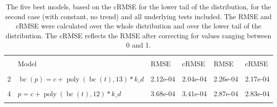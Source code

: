 \documentclass[12pt,a4paper]{article}
\DeclareMathOperator{\bc}{bc}
\DeclareMathOperator{\poly}{poly}
\begin{document}
\begin{table}[!h]

\caption{\label{tab:5_best_all_2}\label{tab:best_all_2} The five best models, based on the cRMSE for the lower tail of the distribution, for the second case (with constant, no trend) and all underlying tests included. The RMSE and cRMSE were calculated over the whole distribution and over the lower tail of the distribution. The cRMSE reflects the RMSE after correcting for values ranging between 0 and 1.}
\centering
\fontsize{10}{12}\selectfont
\begin{tabular}[t]{ll>{\raggedleft\arraybackslash}p{2cm}>{\raggedleft\arraybackslash}p{2cm}>{\raggedleft\arraybackslash}p{2cm}>{\raggedleft\arraybackslash}p{2cm}}
\toprule
\multicolumn{1}{c}{\textbf{}} & \multicolumn{1}{c}{\textbf{}} & \multicolumn{2}{c}{\textbf{Full Distribution}} & \multicolumn{2}{c}{\textbf{Lower Tail ($p \leq 0.2$)}} \\
\cmidrule(l{3pt}r{3pt}){3-4} \cmidrule(l{3pt}r{3pt}){5-6}
  & Model & RMSE & cRMSE & RMSE & cRMSE\\
\midrule
\cellcolor{gray!6}{1} & \cellcolor{gray!6}{$\bc(p) = c + \poly\left( \bc(t), 12 \right) * k\_d$} & \cellcolor{gray!6}{2.05e-04} & \cellcolor{gray!6}{2.02e-04} & \cellcolor{gray!6}{2.15e-04} & \cellcolor{gray!6}{2.11e-04}\\
2 & $\bc(p) = c + \poly\left( \bc(t), 13 \right) * k\_d$ & 2.12e-04 & 2.04e-04 & 2.26e-04 & 2.17e-04\\
\cellcolor{gray!6}{3} & \cellcolor{gray!6}{$p = c + \poly\left( \bc(t), 13 \right) * k\_d$} & \cellcolor{gray!6}{2.83e-04} & \cellcolor{gray!6}{2.68e-04} & \cellcolor{gray!6}{2.80e-04} & \cellcolor{gray!6}{2.66e-04}\\
4 & $p = c + \poly\left( \bc(t), 12 \right) * k\_d$ & 3.68e-04 & 3.41e-04 & 2.87e-04 & 2.83e-04\\
\cellcolor{gray!6}{5} & \cellcolor{gray!6}{$\log(p) = c + \poly\left( \bc(t), 13 \right) * k\_d$} & \cellcolor{gray!6}{3.70e-04} & \cellcolor{gray!6}{3.37e-04} & \cellcolor{gray!6}{4.10e-04} & \cellcolor{gray!6}{3.73e-04}\\
\bottomrule
\end{tabular}
\end{table}
\end{document}
